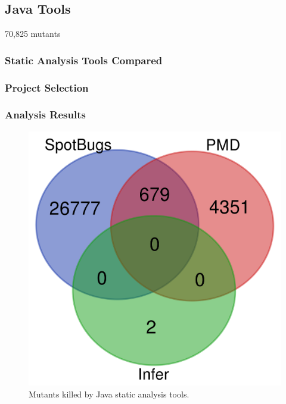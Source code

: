 \subsection{Java Tools}

70,825 mutants

\subsubsection{Static Analysis Tools Compared}

\subsubsection{Project Selection}

\subsubsection{Analysis Results}

\begin{figure}
  \includegraphics[width=\columnwidth]{java.png}
  \caption{Mutants killed by Java static analysis tools.}
  \label{fig:javavenn}
\end{figure}

